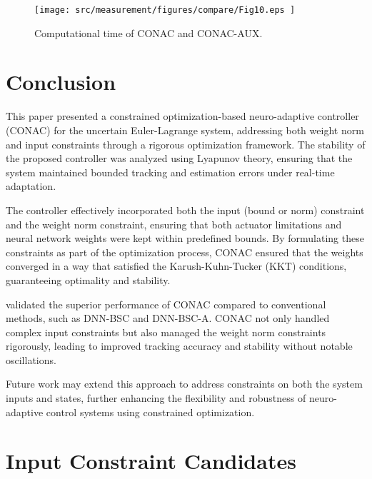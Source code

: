 \documentclass[lettersize,journal]{IEEEtran}
\begin{document}
\begin{figure}[t]
    \centering
        \texttt{[image: 
            src/measurement/figures/compare/Fig10.eps
        ]}%
    \caption{
        Computational time of CONAC and CONAC-AUX. 
    }
    \label{fig:ctrl:real:result:cmp:time}
  \end{figure}

\section{Conclusion}\label{sec:conclusion}

This paper presented a constrained optimization-based neuro-adaptive controller (CONAC) for the uncertain Euler-Lagrange system, addressing both weight norm and input constraints through a rigorous optimization framework. 
The stability of the proposed controller was analyzed using Lyapunov theory, ensuring that the system maintained bounded tracking and estimation errors under real-time adaptation.

The controller effectively incorporated both the input (bound or norm) constraint and the weight norm constraint, ensuring that both actuator limitations and neural network weights were kept within predefined bounds. 
By formulating these constraints as part of the optimization process, CONAC ensured that the weights converged in a way that satisfied the Karush-Kuhn-Tucker (KKT) conditions, guaranteeing optimality and stability.

 validated the superior performance of CONAC compared to conventional methods, such as DNN-BSC and DNN-BSC-A. CONAC not only handled complex input constraints but also managed the weight norm constraints rigorously, leading to improved tracking accuracy and stability without notable oscillations.

Future work may extend this approach to address constraints on both the system inputs and states, further enhancing the flexibility and robustness of neuro-adaptive control systems using constrained optimization.

\appendix

\section{Input Constraint Candidates}\label{sec:appen:cstr} 
\end{document}
